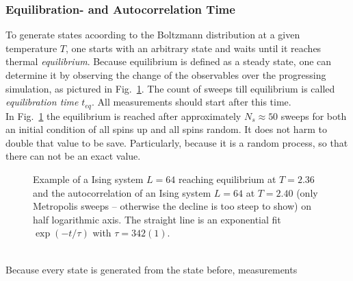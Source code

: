     \subsubsection{Equilibration- and Autocorrelation Time}
    \label{sssec:eqtime}
        To generate states acoording to the Boltzmann distribution at a
        given temperature \(T\), one starts with an arbitrary state
        and waits until it reaches thermal \emph{equilibrium}. Because
        equilibrium is defined as a steady state, one can determine it by
        observing the change of the observables over the progressing
        simulation, as pictured in Fig.\ \ref{fig:equiandauto}.
        The count of sweeps till
        equilibrium is called \emph{equilibration time} \(t_{eq}\).
        All measurements should start after this time.\\
        In Fig.\ \ref{fig:equiandauto}
        the equilibrium is reached after approximately \(N_{s} \approx 50\) sweeps for
        both an initial condition of all spins up and all spins random. It
        does not harm to double that value to be save. Particularly, because
        it is a random process, so that there can not be an exact value.
        \begin{figure}[htbp]
            \centering
            \caption[Examples for Equilibration and Autocorrelation]
            {
                 Example of a Ising system
                    \(L=64\) reaching equilibrium at \(T=2.36\) and
                 the autocorrelation of an
                    Ising system \(L=64\) at \(T=2.40\) (only Metropolis
                    sweeps -- otherwise the decline is too steep to show)
                    on half logarithmic axis.
                    The straight line is an exponential fit \(\exp(-t/\tau)\)
                    with \(\tau = 342(1)\).
            }
            \label{fig:equiandauto}
        \end{figure}\\
        Because every state is generated from the state before, measurements
